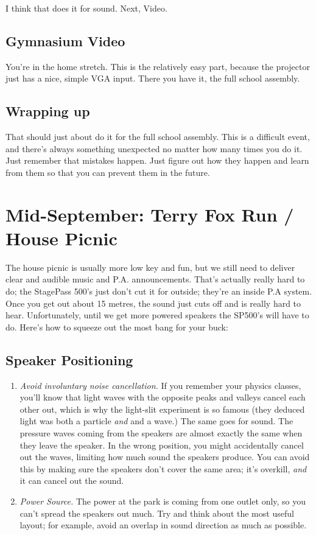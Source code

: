 \documentclass[letterpaper,10pt,oneside,headsepline]{scrreprt}
\begin{document}
I think that does it for sound. Next, Video.

\subsection{Gymnasium Video}
You're in the home stretch. This is the relatively easy part, because the projector just has a nice, simple VGA input. There you have it, the full school assembly.

\subsection{Wrapping up}
That should just about do it for the full school assembly. This is a difficult event, and there's always something unexpected no matter how many times you do it. Just remember that mistakes happen. Just figure out how they happen and learn from them so that you can prevent them in the future.

\section{Mid-September: Terry Fox Run / House Picnic}
The house picnic is usually more low key and fun, but we still need to deliver clear and audible music and P.A. announcements. That's actually really hard to do; the StagePass 500's just don't cut it for outside; they're an inside P.A system. Once you get out about 15 metres, the sound just cuts off and is really hard to hear. Unfortunately, until we get more powered speakers the SP500's will have to do. Here's how to squeeze out the most bang for your buck:
\subsection{Speaker Positioning}
\begin{enumerate}
\item \textit{Avoid involuntary noise cancellation.} If you remember your physics classes, you'll know that light waves with the opposite peaks and valleys cancel each other out, which is why the light-slit experiment is so famous (they deduced light was both a particle \textit{and} and a wave.) The same goes for sound. The pressure waves coming from the speakers are almost exactly the same when they leave the speaker. In the wrong position, you might accidentally cancel out the waves, limiting how much sound the speakers produce. You can avoid this by making sure the speakers don't cover the same area; it's overkill, \textit{and} it can cancel out the sound.

\item  \textit{Power Source.} The power at the park is coming from one outlet only, so you can't spread the speakers out much. Try and think about the most useful layout; for example, avoid an overlap in sound direction as much as possible.
\end{enumerate}
\end{document}
